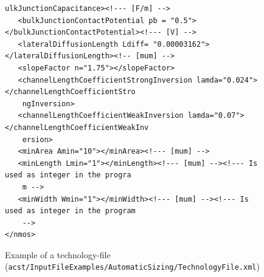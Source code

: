 \begin{figure}[H]
\begin{lstlisting}[basicstyle=\ttfamily\scriptsize,backgroundcolor={\color{gray!30}}, escapechar=? ]
    ulkJunctionCapacitance><!--- [F/m] -->
   <bulkJunctionContactPotential pb = "0.5"></bulkJunctionContactPotential><!--- [V] -->
   <lateralDiffusionLength Ldiff= "0.00003162"></lateralDiffusionLength><!-- [mum] -->
   <slopeFactor n="1.75"></slopeFactor>
   <channelLengthCoefficientStrongInversion lamda="0.024"></channelLengthCoefficientStro
    ngInversion>
   <channelLengthCoefficientWeakInversion lamda="0.07"></channelLengthCoefficientWeakInv
    ersion>
   <minArea Amin="10"></minArea><!--- [mum] -->
   <minLength Lmin="1"></minLength><!--- [mum] --><!--- Is used as integer in the progra
    m -->
   <minWidth Wmin="1"></minWidth><!--- [mum] --><!--- Is used as integer in the program 
    -->
</nmos>	
	\end{lstlisting}
	\caption{Example of a technology-file ({\tt acst/InputFileExamples/AutomaticSizing/\protect \linebreak TechnologyFile.xml})}
\end{figure}

